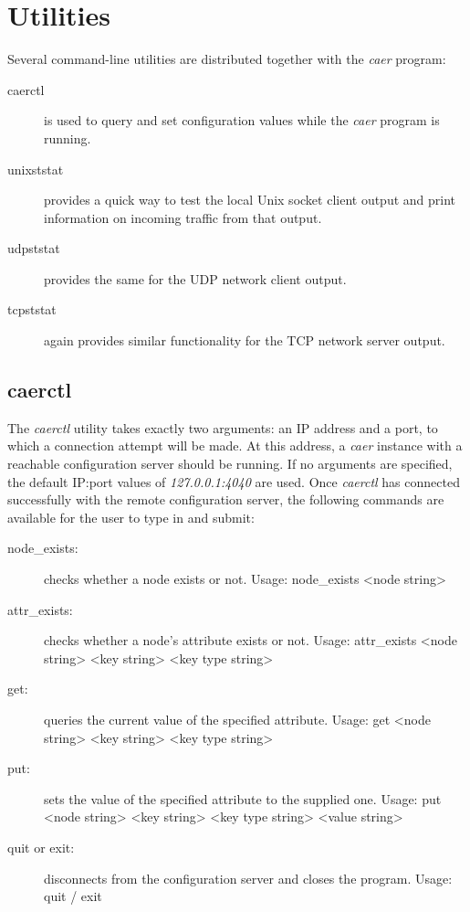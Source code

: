 \documentclass[a4paper,12pt]{report}
\begin{document}
\section{Utilities} \label{sec:utilities}

Several command-line utilities are distributed together with the \emph{caer} program:
\begin{description}
\item[caerctl] is used to query and set configuration values while the \emph{caer} program is running.
\item[unixststat] provides a quick way to test the local Unix socket client output and print information on incoming traffic from that output.
\item[udpststat] provides the same for the UDP network client output.
\item[tcpststat] again provides similar functionality for the TCP network server output.
\end{description}

\subsection{caerctl} \label{subsec:caerctl}

The \emph{caerctl} utility takes exactly two arguments: an IP address and a port, to which a connection attempt will be made. At this address, a \emph{caer} instance with a reachable configuration server should be running.
If no arguments are specified, the default IP:port values of \emph{127.0.0.1:4040} are used.
Once \emph{caerctl} has connected successfully with the remote configuration server, the following commands are available for the user to type in and submit:
\begin{description}
\item[node\_exists:] checks whether a node exists or not.
\subitem Usage: node\_exists <node string>
\item[attr\_exists:] checks whether a node's attribute exists or not.
\subitem Usage: attr\_exists <node string> <key string> <key type string>
\item[get:] queries the current value of the specified attribute.
\subitem Usage: get <node string> <key string> <key type string>
\item[put:] sets the value of the specified attribute to the supplied one.
\subitem Usage: put <node string> <key string> <key type string> <value string>
\item[quit or exit:] disconnects from the configuration server and closes the program.
\subitem Usage: quit / exit
\end{description}
\end{document}
